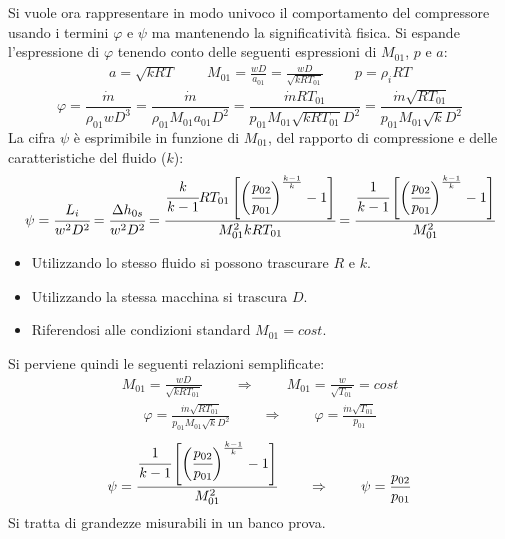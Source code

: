 Si vuole ora rappresentare in modo univoco il comportamento del compressore usando i termini $\varphi$ e $\psi$ ma mantenendo la significatività fisica. Si espande l'espressione di $\varphi$ tenendo conto delle seguenti espressioni di $M_{01}$, $p$ e $a$:
\begin{align*}
a = \sqrt{k R T} \;\;\;\;\;\;\;\; M_{01}=\frac{w D}{a_{01}}= \frac{w D}{\sqrt{k R T_{01}}} \;\;\;\;\;\;\;\; p = \rho_i RT 
\end{align*}
\begin{equation}
\varphi = \frac{\dot{m}}{\rho_{01} w D^3} = \frac{\dot{m}}{\rho_{01} M_{01} a_{01} D^2} = \frac{\dot{m} R T_{01}}{p_{01} M_{01} \sqrt{k R T_{01}} D^2} = \frac{\dot{m} \sqrt{R T_{01}}}{p_{01} M_{01} \sqrt{k} D^2}
\end{equation}
La cifra $\psi$ è esprimibile in funzione di $M_{01}$, del rapporto di compressione e delle caratteristiche del fluido ($k$):
\begin{equation}
\psi = \cfrac{L_i}{w^2 D^2} = \cfrac{\Delta h_{0s}}{w^ 2 D^2} = \cfrac{\cfrac{k}{k-1} R T_{01}\left[ \bigg( \cfrac{p_{02}}{p_{01}} \bigg)^{\frac{k-1}{k}}-1\right]}{M_{01}^2 k R T_{01}} = \cfrac{\cfrac{1}{k-1} \left[ \bigg( \cfrac{p_{02}}{p_{01}} \bigg)^{\frac{k-1}{k}}-1\right]}{M_{01}^2 }
\end{equation}
\begin{itemize}
	\item Utilizzando lo stesso fluido si possono trascurare $R$ e $k$.
	\item Utilizzando la stessa macchina si trascura $D$.
	\item Riferendosi alle condizioni standard $M_{01}=cost$.
\end{itemize}
Si perviene quindi le seguenti relazioni semplificate:
\begin{align*}
M_{01}=\frac{w D}{\sqrt{k R T_{01}}} \;\;\;\;\;\;\;\; \Rightarrow \;\;\;\;\;\;\;\; M_{01}=\frac{w}{\sqrt{T_{01}}}=cost
\end{align*}
\begin{align*}
\varphi=\frac{\dot{m} \sqrt{RT_{01}}}{p_{01} M_{01} \sqrt{k}D^2} \;\;\;\;\;\;\;\; \Rightarrow \;\;\;\;\;\;\;\; \varphi=\frac{\dot{m} \sqrt{T_{01}}}{p_{01}}
\end{align*}
\begin{align*}
\psi= \cfrac{\cfrac{1}{k-1} \left[ \bigg( \cfrac{p_{02}}{p_{01}} \bigg)^{\frac{k-1}{k}}-1\right]}{M_{01}^2 } \;\;\;\;\;\;\;\; \Rightarrow \;\;\;\;\;\;\;\; \psi=\frac{p_{02}}{p_{01}}
\end{align*}
Si tratta di grandezze misurabili in un banco prova.

